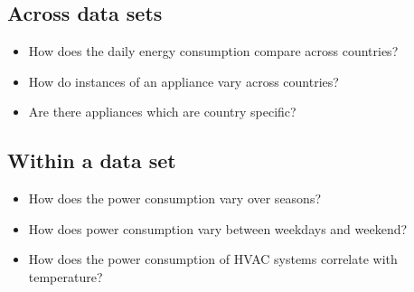 \documentclass{sig-alternate}
\begin{document}
\subsection{Across data sets}
\begin{itemize}
\item How does the daily energy consumption compare across countries?
\item How do instances of an appliance vary across countries?
\item Are there appliances which are country specific?
\end{itemize}

\subsection{Within a data set}
\begin{itemize}
\item How does the power consumption vary over seasons?
\item How does power consumption vary between weekdays and weekend?
\item How does the power consumption of HVAC systems correlate with temperature?
\end{itemize}





\end{document}
